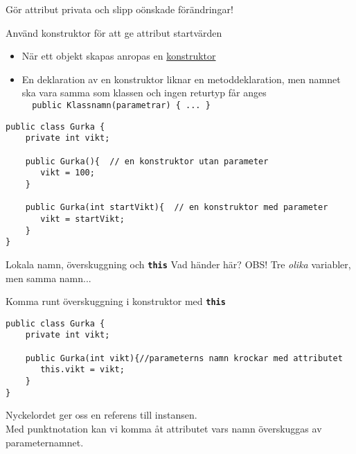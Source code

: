 \documentclass{lecturenotes}
\begin{document}
\begin{Slide}{Gör attribut privata och slipp oönskade förändringar!}

\end{Slide}

\begin{Slide}{Använd konstruktor för att ge attribut startvärden}
\begin{itemize}
\item När ett objekt skapas anropas en \href{https://docs.oracle.com/javase/tutorial/java/javaOO/constructors.html}{konstruktor}
\item En deklaration av en konstruktor liknar en metoddeklaration, men namnet ska vara samma som klassen och ingen  returtyp får anges \\ \lstinline+  public Klassnamn(parametrar) { ... } +
\end{itemize}
\begin{lstlisting}[]
public class Gurka {
    private int vikt;  

    public Gurka(){  // en konstruktor utan parameter
       vikt = 100;
    } 
    
    public Gurka(int startVikt){  // en konstruktor med parameter
       vikt = startVikt;
    } 
}
\end{lstlisting}
\end{Slide}

\begin{Slide}{Lokala namn, överskuggning och \texttt{\textbf{this}}}
\scriptsize Vad händer här? OBS! Tre \textit{olika} variabler, men samma namn...

\end{Slide}

\begin{Slide}{Komma runt överskuggning i konstruktor med \texttt{\textbf{this}}}
\begin{lstlisting}[]
public class Gurka {
    private int vikt;  

    public Gurka(int vikt){//parameterns namn krockar med attributet
       this.vikt = vikt;
    } 
}
\end{lstlisting}
Nyckelordet  ger oss en referens till instansen. \\
Med punktnotation kan vi komma åt attributet vars namn överskuggas av parameternamnet.
\end{Slide}
\end{document}
